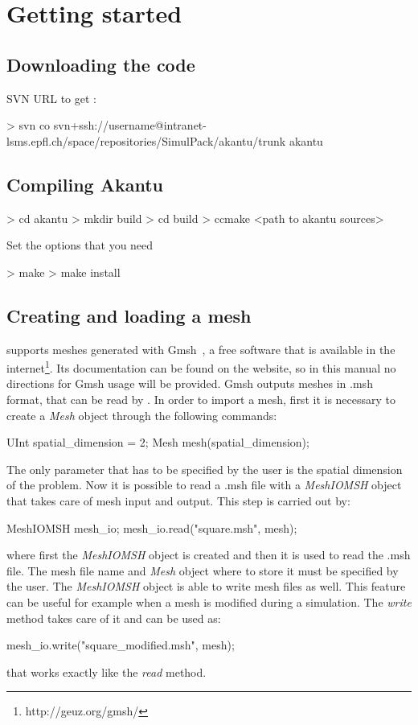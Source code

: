 \chapter{Getting started}
\section{Downloading the code}
SVN URL to get \akantu :
\begin{command}
  > svn co svn+ssh://username@intranet-lsms.epfl.ch/space/repositories/SimulPack/akantu/trunk akantu
\end{command}

\section{Compiling Akantu}
\begin{command}
  > cd akantu
  > mkdir build
  > cd build
  > ccmake <path to akantu sources>
\end{command}

Set the options that you need

\begin{command}
  > make
  > make install
\end{command}

\section{Creating and loading a mesh\label{sect:common:mesh}}

\akantu supports meshes generated with Gmsh~\cite{gmsh}, a free
software that is available in the
internet\footnote{http://geuz.org/gmsh/}. Its documentation can be
found on the website, so in this manual no directions for Gmsh usage
will be provided. Gmsh outputs meshes in .msh format, that can be read
by \akantu. In order to import a mesh, first it is necessary to create
a \textit{Mesh} object through the following commands:
\begin{cpp}
  UInt spatial_dimension = 2;
  Mesh mesh(spatial_dimension);
\end{cpp}
The only parameter that has to be specified by the user is the spatial
dimension of the problem. Now it is possible to read a .msh file with
a \textit{MeshIOMSH} object that takes care of mesh input and
output. This step is carried out by:
\begin{cpp}
  MeshIOMSH mesh_io;
  mesh_io.read("square.msh", mesh);
\end{cpp}
where first the \textit{MeshIOMSH} object is created and then it is
used to read the .msh file. The mesh file name and \textit{Mesh}
object where to store it must be specified by the user. The
\textit{MeshIOMSH} object is able to write mesh files as well. This
feature can be useful for example when a mesh is modified during a
simulation. The \textit{write} method takes care of it and can be used
as:
\begin{cpp}
  mesh_io.write("square_modified.msh", mesh);
\end{cpp}
that works exactly like the \textit{read} method.

